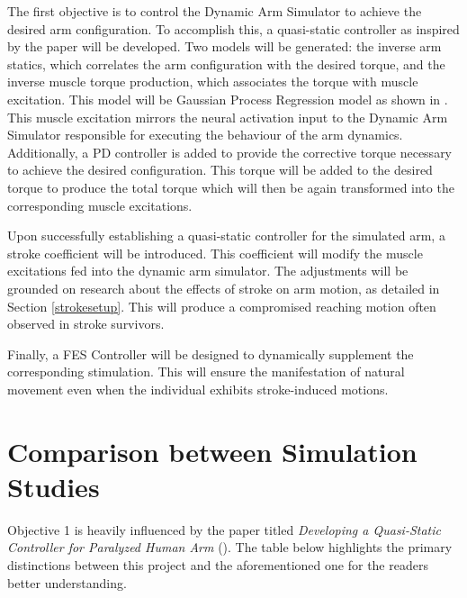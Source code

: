 The first objective is to control the Dynamic Arm Simulator to achieve the desired arm configuration. To accomplish this, a quasi-static controller as inspired by the paper \cite{QSC} will be developed. Two models will be generated: the inverse arm statics, which correlates the arm configuration with the desired torque, and the inverse muscle torque production, which associates the torque with muscle excitation. This model will be Gaussian Process Regression model as shown in \cite{QSC}. This muscle excitation mirrors the neural activation input to the Dynamic Arm Simulator responsible for executing the behaviour of the arm dynamics. Additionally, a PD controller is added to provide the corrective torque necessary to achieve the desired configuration. This torque will be added to the desired torque to produce the total torque which will then be again transformed into the corresponding muscle excitations. 

Upon successfully establishing a quasi-static controller for the simulated arm, a stroke coefficient will be introduced. This coefficient will modify the muscle excitations fed into the dynamic arm simulator. The adjustments will be grounded on research about the effects of stroke on arm motion, as detailed in Section \ref{strokesetup}. This will produce a compromised reaching motion often observed in stroke survivors.

Finally, a FES Controller will be designed to dynamically supplement the corresponding stimulation. This will ensure the manifestation of natural movement even when the individual exhibits stroke-induced motions.



\newpage
\section{Comparison between Simulation Studies}

Objective 1 is heavily influenced by the paper titled \textit{Developing a Quasi-Static Controller for Paralyzed Human Arm} (\cite{QSC}). The table below highlights the primary distinctions between this project and the aforementioned one for the readers better understanding. 

